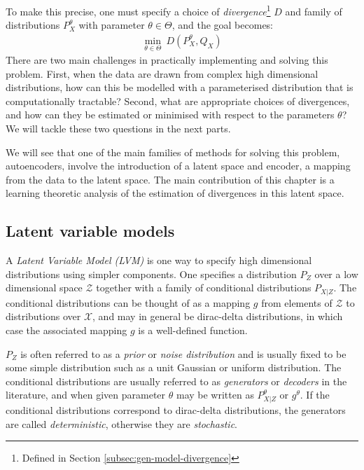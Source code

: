 To make this precise, one must specify a choice of \emph{divergence}\footnote{Defined in Section \ref{subsec:gen-model-divergence}} $D$ and family of distributions $P_X^\theta$ with parameter $\theta\in\Theta$, and the goal becomes:
%
\begin{align*}
\min_{\theta \in \Theta} \ D\left(P_X^\theta,  Q_X \right)
\end{align*}
%
There are two main challenges in practically implementing and solving this problem.
First, when the data are drawn from complex high dimensional distributions, how can this be modelled with a parameterised distribution that is computationally tractable?
Second, what are appropriate choices of divergences, and how can they be estimated or minimised with respect to the parameters $\theta$?
We will tackle these two questions in the next parts. 

We will see that one of the main families of methods for solving this problem, autoencoders, involve the introduction of a latent space and encoder, a mapping from the data to the latent space.
The main contribution of this chapter is a learning theoretic analysis of the estimation of divergences in this latent space. 

\subsection{Latent variable models}

A \emph{Latent Variable Model (LVM)} is one way to specify high dimensional distributions using simpler components. 
One specifies a distribution $P_Z$ over a low dimensional space $\mathcal{Z}$ together with a family of conditional distributions $P_{X|Z}$. 
The conditional distributions can be thought of as a mapping $g$ from elements of $\mathcal{Z}$ to distributions over $\mathcal{X}$,
and may in general be dirac-delta distributions, in which case the associated mapping $g$ is a well-defined function. 

$P_Z$ is often referred to as a \emph{prior} or \emph{noise distribution} and is usually fixed to be some simple distribution such as a unit Gaussian or uniform distribution. 
The conditional distributions are usually referred to as \emph{generators} or \emph{decoders} in the literature, and when given parameter $\theta$ may be written as $P_{X|Z}^\theta$ or $g^\theta$. 
If the conditional distributions correspond to dirac-delta distributions, the generators are called \emph{deterministic}, otherwise they are \emph{stochastic}.

